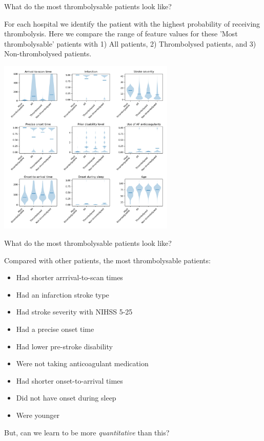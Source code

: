\documentclass{beamer}
\begin{document}

\begin{frame}{What do the most thrombolysable patients look like?}

\scriptsize For each hospital we identify the patient with the highest probability of receiving thrombolysis. Here we compare the range of feature values for these 'Most thrombolysable' patients with 1) All patients, 2) Thrombolysed patients, and 3) Non-thrombolysed patients.


\begin{center}
\includegraphics[width=0.63\textwidth]{./images/02a_most_thrombolsyable_violin.jpg}
\end{center}

\end{frame}


\begin{frame}{What do the most thrombolysable patients look like?}

Compared with other patients, the  most thrombolysable patients:

\vspace{3mm}

\begin{itemize}
\item Had shorter arrrival-to-scan times
\item Had an infarction stroke type
\item Had stroke severity with NIHSS 5-25
\item Had a precise onset time
\item Had lower pre-stroke disability
\item Were not taking anticoagulant medication
\item Had shorter onset-to-arrival times
\item Did not have onset during sleep
\item Were younger
\end{itemize}

\vspace{3mm}

But, can we learn to be more \emph{quantitative} than this?

\end{frame}
\end{document}
